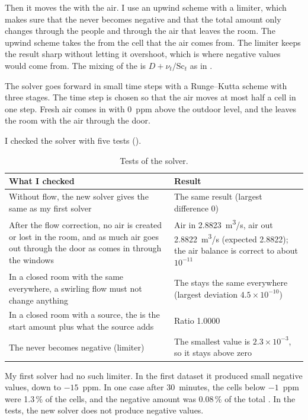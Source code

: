 Then it moves the \cotwo{} with the air. I use an upwind scheme with a limiter, which makes sure that the
\cotwo{} never becomes negative and that the total amount only changes through the people and through the air
that leaves the room. The upwind scheme takes the \cotwo{} from the cell that the air comes from. The limiter keeps
the result sharp without letting it overshoot, which is where negative values would come from. The mixing of the
\cotwo{} is $D+\nu_t/\mathrm{Sc}_t$ as in .

The solver goes forward in small time steps with a Runge--Kutta scheme with three stages. The time step is
chosen so that the air moves at most half a cell in one step. Fresh air comes in with 0~ppm above the outdoor
level, and the \cotwo{} leaves the room with the air through the door.

I checked the solver with five tests ().

\begin{table}[h]
  \centering
  \caption{Tests of the \cotwo{} solver.}
  \label{tab:solvertests}
  \begin{tabular}{>{\raggedright}p{7cm}>{\raggedright\arraybackslash}p{6.7cm}}
    \toprule
    What I checked & Result\\
    \midrule
    Without flow, the new solver gives the same \cotwo{} as my first solver
      & The same result (largest difference 0)\\
    After the flow correction, no air is created or lost in the room, and as much air goes out through the door as
      comes in through the windows
      & Air in 2.8823~m\textsuperscript{3}/s, air out 2.8822~m\textsuperscript{3}/s (expected 2.8822); the air balance is
        correct to about $10^{-11}$\\
    In a closed room with the same \cotwo{} everywhere, a swirling flow must not change anything
      & The \cotwo{} stays the same everywhere (largest deviation $4.5\times10^{-10}$)\\
    In a closed room with a \cotwo{} source, the \cotwo{} is the start amount plus what the source adds
      & Ratio 1.0000\\
    The \cotwo{} never becomes negative (limiter)
      & The smallest value is $2.3\times10^{-3}$, so it stays above zero\\
    \bottomrule
  \end{tabular}
\end{table}

My first \cotwo{} solver had no such limiter. In the first dataset it produced small negative values, down
to $-15$~ppm. In one case after 30~minutes, the cells below $-1$~ppm were 1.3\,\% of the cells, and the
negative amount was 0.08\,\% of the total \cotwo{}. In the tests, the new solver does not produce
negative values.

